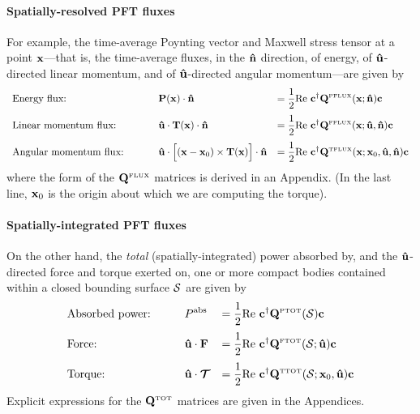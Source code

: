 \documentclass[letterpaper]{article}
\begin{document}
\paragraph{Spatially-resolved PFT fluxes} 
For example, the time-average Poynting vector and Maxwell stress 
tensor at a point $\mathbf{x}$---that is, the time-average fluxes,
in the $\mathbf{\hat n}$ direction, of energy, of $\mathbf{\hat u}$-directed
linear momentum, and of $\mathbf{\hat u}$-directed angular momentum---are
given by
$$\begin{array}{*3{>{\displaystyle}l}}
\text{Energy flux: } \qquad 
&\vb P(\vb x) \cdot \vbhat{n} 
&=\frac{1}{2}\text{Re }
   \vb c^\dagger \vb Q\supt{PFLUX}(\vb x; \vbhat{n}) \vb c
\\[10pt]
\text{Linear momentum flux: } \qquad 
&\vbhat{u} \cdot \vb T(\vb x) \cdot \vbhat{n}
&=\frac{1}{2}\text{Re }
   \vb c^\dagger \vb Q\supt{FFLUX}(\vb x; \vbhat{u}, \vbhat{n}) \vb c
\\[10pt]
\text{Angular momentum flux: } \qquad 
&\vbhat{u} \cdot \Big[(\vb x-\vb x_0) \times \vb T(\vb x)\Big] \cdot \vbhat{n}
&=\frac{1}{2}\text{Re }
   \vb c^\dagger \vb Q\supt{TFLUX}(\vb x; \vb x_0, \vbhat{u}, \vbhat{n}) \vb c
\end{array}$$
where the form of the $\mathbf{Q}^{\hbox{\tiny{FLUX}}}$ matrices is derived in
an Appendix. (In the last line, $\mathbf{x}_0$ is the origin about which 
we are computing the torque).

\paragraph{Spatially-integrated PFT fluxes} 
On the other hand, the \textit{total} (spatially-integrated)
power absorbed by, and the $\mathbf{\hat u}$-directed force and torque 
exerted on, one or more compact bodies contained within a 
closed bounding surface $\mathcal{S}$ are given by 
$$\begin{array}{*3{>{\displaystyle}l}}
\text{Absorbed power:} \qquad 
& P\sups{abs}
&=\frac{1}{2}\text{Re }
   \vb c^\dagger \vb Q\supt{PTOT}(\mc S) \vb c
\\[10pt]
\text{Force: } \qquad 
&\vbhat{u} \cdot \vb F
&=\frac{1}{2}\text{Re }
   \vb c^\dagger \vb Q\supt{FTOT}(\mc S; \vbhat{u}) \vb c
\\[10pt]
\text{Torque: } \qquad 
&\vbhat{u} \cdot \bmc T
&=\frac{1}{2}\text{Re }
   \vb c^\dagger \vb Q\supt{TTOT}(\mc S; \vb x_0, \vbhat{u}) \vb c
\end{array}$$
Explicit expressions for the $\mathbf{Q}^{\hbox{\tiny{TOT}}}$ matrices are given
in the Appendices.
\end{document}
